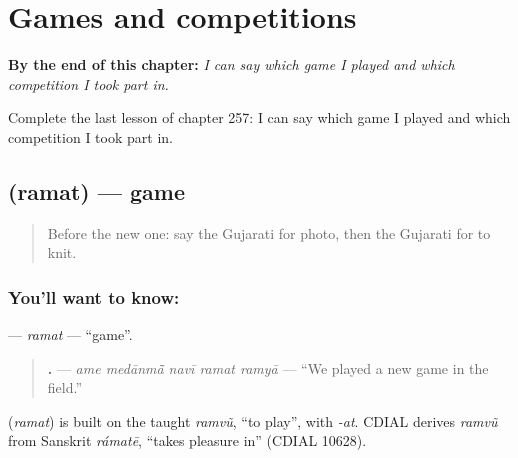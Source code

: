 
\chapter{Games and competitions}
\label{ch:gu-games-and-competitions}

\begin{chapteropening}
\textbf{By the end of this chapter:} \emph{I can say which game I played and which competition I took part in.}

Complete the last lesson of chapter 257: I can say which game I played and which competition I took part in.
\end{chapteropening}

\section[\texorpdfstring{\gu{રમત} (ramat)}{રમત (ramat)}]{ (ramat) — game}

\label{lesson:GU-C257-ramat}



\begin{quote}
Before the new one: say the Gujarati for photo, then the Gujarati for to knit.
\end{quote}

\subsection*{You'll want to know: }
\textbf{} — \emph{ramat} — \textquotedblleft{}game\textquotedblright{}.

\begin{quote}
\textbf{    .} — \emph{ame medānmā̃ navī ramat ramyā} — \textquotedblleft{}We played a new game in the field.\textquotedblright{}
\end{quote}

\begin{cousinweb}
\textbf{} (\emph{ramat}) is built on the taught \emph{ramvũ}, \textquotedblleft{}to play\textquotedblright{}, with \emph{-at}. CDIAL derives \emph{ramvũ} from Sanskrit \emph{rámatē}, \textquotedblleft{}takes pleasure in\textquotedblright{} (CDIAL 10628).
\end{cousinweb}

